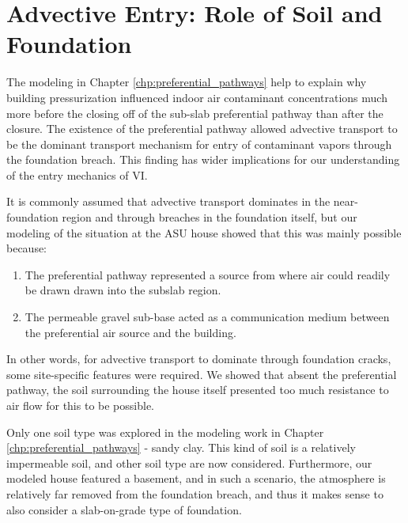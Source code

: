 \section{Advective Entry: Role of Soil and Foundation}

The modeling in Chapter \ref{chp:preferential_pathways} help to explain why building pressurization influenced indoor air contaminant concentrations much more before the closing off of the sub-slab preferential pathway than after the closure.
The existence of the preferential pathway allowed advective transport to be the dominant transport mechanism for entry of contaminant vapors through the foundation breach.
This finding has wider implications for our understanding of the entry mechanics of VI.\par

It is commonly assumed that advective transport dominates in the near-foundation region and through breaches in the foundation itself, but our modeling of the situation at the ASU house showed that this was mainly possible because:
\begin{enumerate}
  \item The preferential pathway represented a source from where air could readily be drawn drawn into the subslab region.
  \item The permeable gravel sub-base acted as a communication medium between the preferential air source and the building.
\end{enumerate}
In other words, for advective transport to dominate through foundation cracks, some site-specific features were required.
We showed that absent the preferential pathway, the soil surrounding the house itself presented too much resistance to air flow for this to be possible.\par

Only one soil type was explored in the modeling work in Chapter \ref{chp:preferential_pathways} - sandy clay.
This kind of soil is a relatively impermeable soil, and other soil type are now considered.
Furthermore, our modeled house featured a basement, and in such a scenario, the atmosphere is relatively far removed from the foundation breach, and thus it makes sense to also consider a slab-on-grade type of foundation.\par

